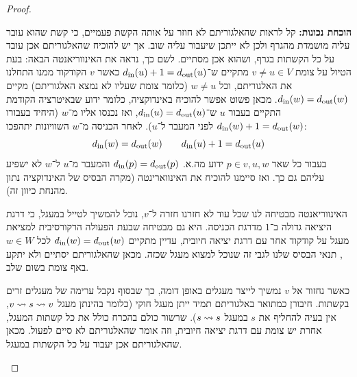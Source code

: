 \documentclass[]{../../../../tex/classes/homework}
\begin{document}
\begin{enumerate}[(A)]
\begin{proof}
\begin{itemize}
				\textbf{הוכחת נכונות: }קל לראות שהאלגוריתם לא חוזר על אותה הקשת פעמיים, כי קשת שהוא עובר עליה מושמדת מהגרף ולכן לא ייתכן שיעבור עליה שוב. אך יש להוכיח שהאלגוריתם אכן עובד על כל הקשתות בגרף, ושהוא אכן מסתיים. לשם כך, נראה את האינווריאנטה הבאה: בעת הטיול על צומת $v \neq u \in V$  מתקיים ש־$d_{\mathrm{in}}(u) + 1 = d_{\mathrm{out}}(u)$ כאשר $v$ הקודקוד ממנו התחלנו את האלגוריתם, וכל $w \neq u$ (כלומר צומת שעליו לא נמצא האלגוריתם) מקיים $d_{\mathrm{in}}(w) = d_{\mathrm{out}}(w)$. מכאן פשוט אפשר להוכיח באינדוקציה, כלומר ידוע שבאיטרציה הקודמת התקיים בעבור $u$ ש־$d_{\mathrm{in}}(u) = d_{\mathrm{out}}(u)$, ואז נכנסו אליו מ־$w$ (היחיד בעבורו $d_{\mathrm{in}}(w) + 1 = d_{\mathrm{out}}(w)$ לפני המעבר ל־$u$). לאחר הכניסה מ־$w$ השוויונות יתהפכו: 
				\[ d_{\mathrm{in}}(w) = d_{\mathrm{out}}(w) \quad\quad d_{\mathrm{in}}(u) + 1 =  d_{\mathrm{out}}(u) \]
				בעבור כל שאר $p \in v, u, w$ ידוע מה.א. $d_{\mathrm{in}}(p) = d_{\mathrm{out}}(p)$ והמעבר מ־$u$ ל־$w$ לא ישפיע עליהם גם כך. ואז סיימנו להוכיח את האינווארינטה (מקרה הבסיס של האינדוקציה נתון מהנחת כיוון זה). 
				
				האינווריאנטה מבטיחה לנו שכל עוד לא חזרנו חזרה ל־$v$, נוכל להמשיך לטייל במעגל, כי דרגת היציאה גדולה ב־$1$ מדרגת הכניסה. היא גם מבטיחה שבעת הפעולה הרקורסיבית למציאת מעגל על קודקוד אחר עם דרגת יציאה חיובית, עדיין מתקיים $d_{\mathrm{in}}(w) = d_{\mathrm{out}}(w)$ לכל $w \in W$, תנאי הבסיס שלנו לגבי זה שנוכל למצוא מעגל שכזה. מכאן שהאלגוריתם יסתיים ולא יתקע באף צומת בשום שלב. 
				
				כאשר נחזור אל $v$ נמשיך לייצר מעגלים באופן דומה, כך שבסוף נקבל ערימה של מעגלים זרים בקשתות. חיבורן כמתואר באלגוריתם תמיד ייתן מעגל חוקי (כלומר בהינתן מעגל $v \rightsquigarrow s \rightsquigarrow v$, אין בעיה להחליף את $s$ במעגל $s \rightsquigarrow s$). שרשור כולם בהכרח כולל את כל קשתות המעגל, אחרת יש צומת עם דרגת יציאה חיובית, וזה אומר שהאלגוריתם לא סיים לפעול. מכאן שהאלגוריתם אכן יעבוד על כל הקשתות במעגל. 
				

\end{itemize}
\end{proof}
\end{enumerate}
\end{document}
